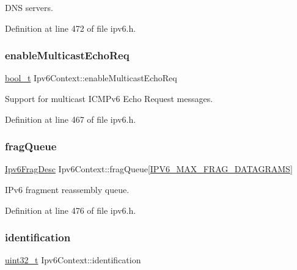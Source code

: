 D\+NS servers. 



Definition at line 472 of file ipv6.\+h.

\mbox{\label{structIpv6Context_ae7dca5b9f205007c192e8e2322ae713d}} 
\subsubsection{\texorpdfstring{enable\+Multicast\+Echo\+Req}{enableMulticastEchoReq}}
{\footnotesize\ttfamily \hyperlink{compiler__port_8h_a812d16e5494522586b3784e55d479912}{bool\+\_\+t} Ipv6\+Context\+::enable\+Multicast\+Echo\+Req}



Support for multicast I\+C\+M\+Pv6 Echo Request messages. 



Definition at line 467 of file ipv6.\+h.

\mbox{\label{structIpv6Context_ab6742e4275aba216d1a6d6c4a428646e}} 
\subsubsection{\texorpdfstring{frag\+Queue}{fragQueue}}
{\footnotesize\ttfamily \hyperlink{structIpv6FragDesc}{Ipv6\+Frag\+Desc} Ipv6\+Context\+::frag\+Queue\mbox{[}\hyperlink{net__config_8h_a32fb76378a9b006c9aff62f2f40ac143}{I\+P\+V6\+\_\+\+M\+A\+X\+\_\+\+F\+R\+A\+G\+\_\+\+D\+A\+T\+A\+G\+R\+A\+MS}\mbox{]}}



I\+Pv6 fragment reassembly queue. 



Definition at line 476 of file ipv6.\+h.

\mbox{\label{structIpv6Context_ac20009d3548073769826a1f24683dc00}} 
\subsubsection{\texorpdfstring{identification}{identification}}
{\footnotesize\ttfamily \hyperlink{stdint_8h_a435d1572bf3f880d55459d9805097f62}{uint32\+\_\+t} Ipv6\+Context\+::identification}



